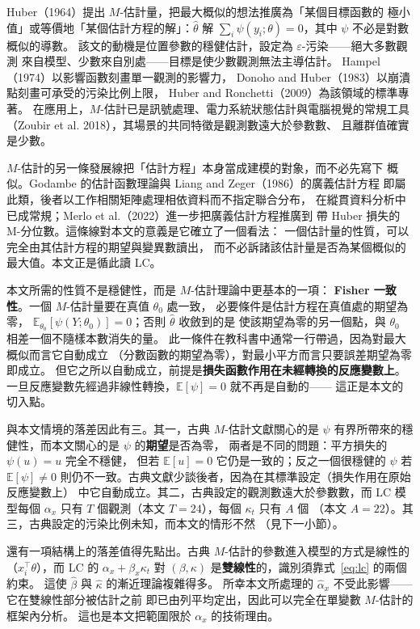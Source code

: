 \documentclass[UTF8, fontset=macnew, a4paper, 12pt]{ctexart}
\newcommand{\Ex}{\mathbb{E}}
\begin{document}
Huber（1964）提出 $M$-估計量，把最大概似的想法推廣為「某個目標函數的
極小值」或等價地「某個估計方程的解」：$\hat\theta$ 解
$\sum_i\psi(y_i;\theta)=0$，其中 $\psi$ 不必是對數概似的導數。
該文的動機是位置參數的穩健估計，設定為 $\varepsilon$-污染——絕大多數觀測
來自模型、少數來自別處——目標是使少數觀測無法主導估計。
Hampel（1974）以影響函數刻畫單一觀測的影響力，
Donoho and Huber（1983）以崩潰點刻畫可承受的污染比例上限，
Huber and Ronchetti（2009）為該領域的標準專著。
在應用上，$M$-估計已是訊號處理、電力系統狀態估計與電腦視覺的常規工具
（Zoubir et al. 2018），其場景的共同特徵是觀測數遠大於參數數、
且離群值確實是少數。

$M$-估計的另一條發展線把「估計方程」本身當成建模的對象，而不必先寫下
概似。Godambe 的估計函數理論與 Liang and Zeger（1986）的廣義估計方程
即屬此類，後者以工作相關矩陣處理相依資料而不指定聯合分布，
在縱貫資料分析中已成常規；Merlo et al.（2022）進一步把廣義估計方程推廣到
帶 Huber 損失的 M-分位數。這條線對本文的意義是它確立了一個看法：
一個估計量的性質，可以完全由其估計方程的期望與變異數讀出，
而不必訴諸該估計量是否為某個概似的最大值。本文正是循此讀 LC。

本文所需的性質不是穩健性，而是 $M$-估計理論中更基本的一項：
\textbf{Fisher 一致性}。一個 $M$-估計量要在真值 $\theta_0$ 處一致，
必要條件是估計方程在真值處的期望為零，
$\Ex_{\theta_0}[\psi(Y;\theta_0)]=0$；否則 $\hat\theta$ 收斂到的是
使該期望為零的另一個點，與 $\theta_0$ 相差一個不隨樣本數消失的量。
此一條件在教科書中通常一行帶過，因為對最大概似而言它自動成立
（分數函數的期望為零），對最小平方而言只要誤差期望為零即成立。
但它之所以自動成立，前提是\textbf{損失函數作用在未經轉換的反應變數上}。
一旦反應變數先經過非線性轉換，$\Ex[\psi]=0$ 就不再是自動的——
這正是本文的切入點。

與本文情境的落差因此有三。其一，古典 $M$-估計文獻關心的是
$\psi$ 有界所帶來的穩健性，而本文關心的是 $\psi$ 的\textbf{期望}是否為零，
兩者是不同的問題：平方損失的 $\psi(u)=u$ 完全不穩健，
但若 $\Ex[u]=0$ 它仍是一致的；反之一個很穩健的 $\psi$ 若 $\Ex[\psi]\ne0$
則仍不一致。古典文獻少談後者，因為在其標準設定（損失作用在原始反應變數上）
中它自動成立。其二，古典設定的觀測數遠大於參數數，而 LC 模型每個
$\alpha_x$ 只有 $T$ 個觀測（本文 $T=24$），每個 $\kappa_t$ 只有 $A$ 個
（本文 $A=22$）。其三，古典設定的污染比例未知，而本文的情形不然
（見下一小節）。

還有一項結構上的落差值得先點出。古典 $M$-估計的參數進入模型的方式是線性的
（$x_i^{\top}\theta$），而 LC 的 $\alpha_x+\beta_x\kappa_t$ 對
$(\beta,\kappa)$ 是\textbf{雙線性}的，識別須靠式~\eqref{eq:lc} 的兩個約束。
這使 $\hat\beta$ 與 $\hat\kappa$ 的漸近理論複雜得多。
所幸本文所處理的 $\hat\alpha_x$ 不受此影響——它在雙線性部分被估計之前
即已由列平均定出，因此可以完全在單變數 $M$-估計的框架內分析。
這也是本文把範圍限於 $\alpha_x$ 的技術理由。
\end{document}
